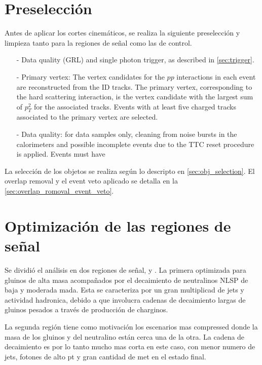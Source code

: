 \section{Preselección}\label{sec:base_seleccion}

Antes de aplicar los cortes cinemáticos, se realiza la siguiente
preselección y limpieza tanto para la regiones de señal como las de control.

\begin{itemize}\itemsep0.1cm
\item[-] Data quality (GRL) and single photon trigger, as described in \cref{sec:trigger}.
\item[-] Primary vertex:
The vertex candidates for the $pp$ interactions in each event are reconstructed from the ID tracks. The
primary vertex, corresponding to the hard scattering interaction, is the vertex candidate with the largest
sum of $p_{T}^{2}$ for the associated tracks. Events with at least five charged tracks associated to the primary
vertex are selected.
\item[-] Data quality: for data samples only, cleaning from noise bursts in the calorimeters and possible incomplete events due to the TTC reset procedure is applied. Events must
have %
\end{itemize}

La selección de los objetos se realiza según lo descripto en \cref{sec:obj_selection}.
El overlap removal y el event veto aplicado se detalla en la \cref{sec:overlap_romoval_event_veto}.

\section{Optimización de las regiones de se\~nal}

Se dividió el análisis en dos regiones de señal, {\SRL} y {\SRH}.
La primera optimizada para gluinos de alta masa acompañados por el decaimiento de
neutralinos NLSP de baja y moderada mada. Esta se caracteriza por un gran multiplicad
de jets y actividad hadronica, debido a que involucra cadenas de decaimiento largas de gluinos
pesados a través de producción de charginos.

La segunda región tiene como motivación los escenarios mas compressed donde la masa de los gluinos
y del neutralino están cerca una de la otra. La cadena de decaimiento es por lo tanto mucho mas corta
en este caso, con menor numero de jets, fotones de alto pt y gran cantidad de met en el estado final.

